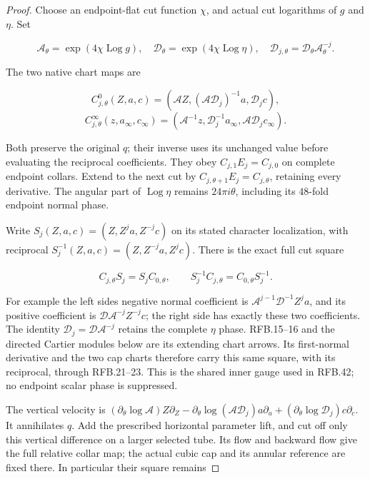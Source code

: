 \begin{proof}
\par\nobreak

Choose an endpoint-flat cut function \(\chi\), and actual cut
logarithms of \(g\) and \(\eta\). Set

\[
 \mathcal A_\theta=\exp(4\chi\operatorname{Log}g),\quad
 \mathcal D_\theta=\exp(4\chi\operatorname{Log}\eta),\quad
 \mathcal D_{j,\theta}=\mathcal D_\theta\mathcal A_\theta^{-j}.
 \tag{RFB.18}
\]

The two native chart maps are

\[
 C^0_{j,\theta}(Z,a,c)=
 (\mathcal AZ,(\mathcal A\mathcal D_j)^{-1}a,\mathcal D_jc),
\]
\[
 C^\infty_{j,\theta}(z,a_\infty,c_\infty)=
 (\mathcal A^{-1}z,\mathcal D_j^{-1}a_\infty,
                         \mathcal A\mathcal D_jc_\infty).
 \tag{RFB.19}
\]

Both preserve the original \(q\); their inverse uses its unchanged
value before evaluating the reciprocal coefficients. They obey
\(C_{j,1}E_j=C_{j,0}\) on complete endpoint collars. Extend to the
next cut by \(C_{j,\theta+1}E_j=C_{j,\theta}\), retaining every
derivative. The angular part of \(\operatorname{Log}\eta\) remains
\(24\pi i\theta\), including its \(48\)-fold endpoint normal phase.

Write \(S_j(Z,a,c)=(Z,Z^ja,Z^{-j}c)\) on its stated character
localization, with reciprocal \(S_j^{-1}(Z,a,c)=(Z,Z^{-j}a,Z^jc)\).
There is the exact full cut square

\[
 C_{j,\theta}S_j=S_jC_{0,\theta},\qquad
 S_j^{-1}C_{j,\theta}=C_{0,\theta}S_j^{-1}.
 \tag{RFB.19a}
\]

For example the left side\textquotesingle s negative normal coefficient is
\(\mathcal A^{j-1}\mathcal D^{-1}Z^ja\), and its positive
coefficient is \(\mathcal D\mathcal A^{-j}Z^{-j}c\);
the right side has exactly these two coefficients. The identity
\(\mathcal D_j=\mathcal D\mathcal A^{-j}\) retains the complete
\(\eta\) phase. RFB.15--16 and the directed Cartier modules below
are its extending chart arrows. Its first-normal derivative and
the two cap charts therefore carry this same square, with its
reciprocal, through RFB.21--23. This is the shared inner gauge used
in RFB.42; no endpoint scalar phase is suppressed.

The vertical velocity is
\((\partial_\theta\log\mathcal A)Z\partial_Z
 -\partial_\theta\log(\mathcal A\mathcal D_j)a\partial_a
 +(\partial_\theta\log\mathcal D_j)c\partial_c\).
It annihilates \(q\). Add the prescribed horizontal parameter lift,
and cut off only this vertical difference on a larger selected tube.
Its flow and backward flow give the full relative collar map;
the actual cubic cap and its annular reference are fixed there.
In particular their square remains


\end{proof}
